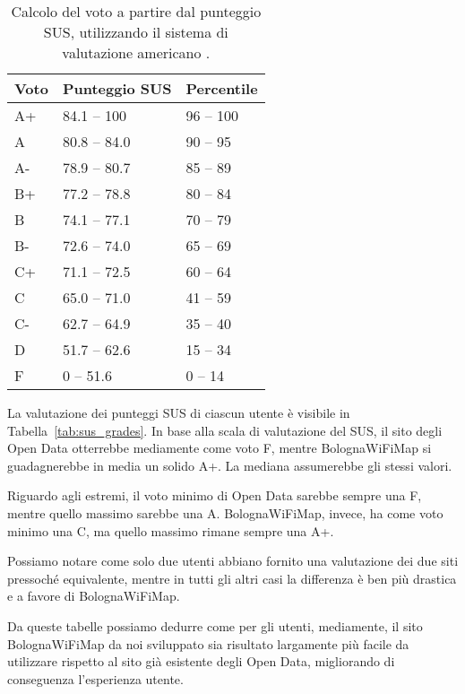 \begin{center}
    \begin{table}[H]
        \centering
        \begin{tabularx}{\textwidth}{|X|X|X|}
            \hline
            \textbf{Voto} & \textbf{Punteggio SUS} & \textbf{Percentile} \\
            \hline
            A+  & 84.1 -- 100   & 96 -- 100 \\
            A   & 80.8 -- 84.0  & 90 -- 95  \\
            A-  & 78.9 -- 80.7  & 85 -- 89  \\
            B+  & 77.2 -- 78.8  & 80 -- 84  \\
            B   & 74.1 -- 77.1  & 70 -- 79  \\
            B-  & 72.6 -- 74.0  & 65 -- 69  \\
            C+  & 71.1 -- 72.5  & 60 -- 64  \\
            C   & 65.0 -- 71.0  & 41 -- 59  \\
            C-  & 62.7 -- 64.9  & 35 -- 40  \\
            D   & 51.7 -- 62.6  & 15 -- 34  \\
            F   & 0 -- 51.6     & 0 -- 14   \\
            \hline
        \end{tabularx}
        \caption[Calcolo del voto a partire dal punteggio SUS]{Calcolo del voto a partire dal punteggio SUS, utilizzando il sistema di valutazione americano \cite{SUS}.}
        \label{tab:sus_grading_system}
    \end{table}
\end{center}

La valutazione dei punteggi SUS di ciascun utente è visibile in Tabella~\ref{tab:sus_grades}. In base alla scala di valutazione del SUS, il sito degli Open Data otterrebbe mediamente come voto F, mentre BolognaWiFiMap si guadagnerebbe in media un solido A+. La mediana assumerebbe gli stessi valori.

Riguardo agli estremi, il voto minimo di Open Data sarebbe sempre una F, mentre quello massimo sarebbe una A. BolognaWiFiMap, invece, ha come voto minimo una C, ma quello massimo rimane sempre una A+.

Possiamo notare come solo due utenti abbiano fornito una valutazione dei due siti pressoché equivalente, mentre in tutti gli altri casi la differenza è ben più drastica e a favore di BolognaWiFiMap.

Da queste tabelle possiamo dedurre come per gli utenti, mediamente, il sito BolognaWiFiMap da noi sviluppato sia risultato largamente più facile da utilizzare rispetto al sito già esistente degli Open Data, migliorando di conseguenza l'esperienza utente.

